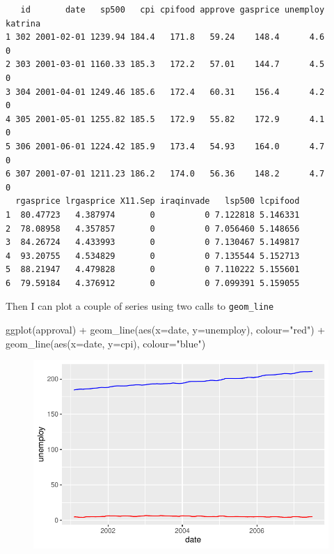 \documentclass[
  letterpaper,
]{book}
\newenvironment{Shaded}{\begin{snugshade}}{\end{snugshade}}
\newcommand{\AttributeTok}[1]{\textcolor[rgb]{0.40,0.45,0.13}{#1}}
\newcommand{\FunctionTok}[1]{\textcolor[rgb]{0.28,0.35,0.67}{#1}}
\newcommand{\NormalTok}[1]{\textcolor[rgb]{0.00,0.23,0.31}{#1}}
\newcommand{\SpecialCharTok}[1]{\textcolor[rgb]{0.37,0.37,0.37}{#1}}
\newcommand{\StringTok}[1]{\textcolor[rgb]{0.13,0.47,0.30}{#1}}
\begin{document}
\begin{verbatim}
   id       date   sp500   cpi cpifood approve gasprice unemploy katrina
1 302 2001-02-01 1239.94 184.4   171.8   59.24    148.4      4.6       0
2 303 2001-03-01 1160.33 185.3   172.2   57.01    144.7      4.5       0
3 304 2001-04-01 1249.46 185.6   172.4   60.31    156.4      4.2       0
4 305 2001-05-01 1255.82 185.5   172.9   55.82    172.9      4.1       0
5 306 2001-06-01 1224.42 185.9   173.4   54.93    164.0      4.7       0
6 307 2001-07-01 1211.23 186.2   174.0   56.36    148.2      4.7       0
  rgasprice lrgasprice X11.Sep iraqinvade   lsp500 lcpifood
1  80.47723   4.387974       0          0 7.122818 5.146331
2  78.08958   4.357857       0          0 7.056460 5.148656
3  84.26724   4.433993       0          0 7.130467 5.149817
4  93.20755   4.534829       0          0 7.135544 5.152713
5  88.21947   4.479828       0          0 7.110222 5.155601
6  79.59184   4.376912       0          0 7.099391 5.159055
\end{verbatim}

Then I can plot a couple of series using two calls to
\texttt{geom\_line}

\begin{Shaded}
\begin{Highlighting}[]
\FunctionTok{ggplot}\NormalTok{(approval) }\SpecialCharTok{+}
  \FunctionTok{geom\_line}\NormalTok{(}\FunctionTok{aes}\NormalTok{(}\AttributeTok{x=}\NormalTok{date, }\AttributeTok{y=}\NormalTok{unemploy), }\AttributeTok{colour=}\StringTok{"red"}\NormalTok{) }\SpecialCharTok{+}
  \FunctionTok{geom\_line}\NormalTok{(}\FunctionTok{aes}\NormalTok{(}\AttributeTok{x=}\NormalTok{date, }\AttributeTok{y=}\NormalTok{cpi), }\AttributeTok{colour=}\StringTok{"blue"}\NormalTok{) }
\end{Highlighting}
\end{Shaded}

\begin{figure}[H]

{\centering \includegraphics{Appendix1_files/figure-pdf/unnamed-chunk-5-1.pdf}

}

\end{figure}
\end{document}
